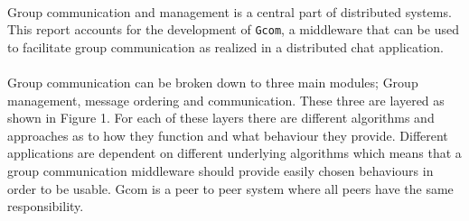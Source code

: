 \paragraph{}{
    Group communication and management is a central part of distributed systems.
This report accounts for the development of \texttt{Gcom}, a middleware that can be used to facilitate group communication as realized in a distributed chat application.
}
\paragraph{}{
Group communication can be broken down to three main modules; Group management, message ordering and communication. These three are layered as shown in Figure 1. For each of these layers there are different algorithms and approaches as to how they function and what behaviour they provide.
Different applications are dependent on different underlying algorithms which means that a group communication middleware should provide easily chosen behaviours in order to be usable.
Gcom is a peer to peer system where all peers have the same responsibility.
}
